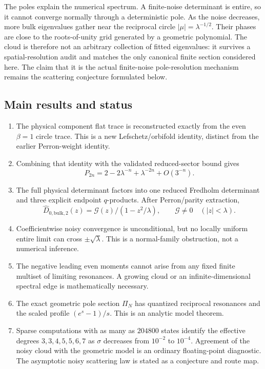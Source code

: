\documentclass[11pt]{article}
\theoremstyle{definition}
\theoremstyle{remark}
\newcommand{\cG}{\mathcal G}
\begin{document}
The poles explain the numerical spectrum.  A finite-noise determinant is
entire, so it cannot converge normally through a deterministic pole.  As the
noise decreases, more bulk eigenvalues gather near the reciprocal circle
$|\mu|=\lambda^{-1/2}$.  Their phases are close to the roots-of-unity grid
generated by a geometric polynomial.  The cloud is therefore not an
arbitrary collection of fitted eigenvalues: it survives a spatial-resolution
audit and matches the only canonical finite section considered here.  The
claim that it is the actual finite-noise pole-resolution mechanism remains
the scattering conjecture formulated below.

\subsection*{Main results and status}

\begin{enumerate}[label=\textbf{R\arabic*.},leftmargin=3.2em]
 \item The physical component flat trace is reconstructed exactly from the
 even $\beta=1$ circle trace.  This is a new Lefschetz/orbifold identity,
 distinct from the earlier Perron-weight identity.

 \item Combining that identity with the validated reduced-sector bound gives
 \[
  P_{2n}=2-2\lambda^{-n}+\lambda^{-2n}+O(3^{-n}).
 \]

 \item The full physical determinant factors into one reduced Fredholm
 determinant and three explicit endpoint $q$-products.  After Perron/parity
 extraction,
 \[
  \widehat D_{0,\mathrm{bulk},2}(z)
  =\cG(z)/(1-z^2/\lambda),
  \qquad \cG\ne0\quad(|z|<\lambda).
 \]

 \item Coefficientwise noisy convergence is unconditional, but no locally
 uniform entire limit can cross $\pm\sqrt\lambda$.  This is a normal-family
 obstruction, not a numerical inference.

 \item The negative leading even moments cannot arise from any fixed finite
 multiset of limiting resonances.  A growing cloud or an infinite-dimensional
 spectral edge is mathematically necessary.

 \item The exact geometric pole section $\Pi_N$ has quantized reciprocal
 resonances and the scaled profile $(e^s-1)/s$.  This is an analytic model
 theorem.

 \item Sparse computations with as many as $204800$ states identify the
 effective degrees $3,3,4,5,5,6,7$ as $\sigma$ decreases from $10^{-2}$ to
 $10^{-4}$.  Agreement of the noisy cloud with the geometric model is an
 ordinary floating-point diagnostic.  The asymptotic noisy scattering law is
 stated as a conjecture and route map.
\end{enumerate}
\end{document}
